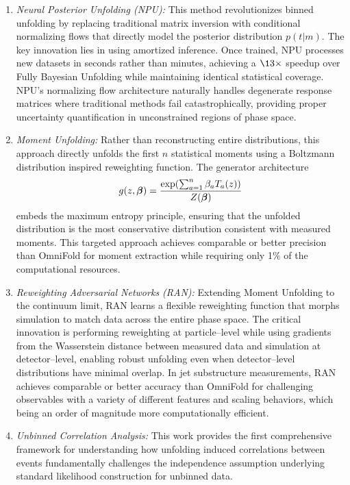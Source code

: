         \begin{enumerate}
            \item \emph{Neural Posterior Unfolding (NPU):} This method revolutionizes binned unfolding by replacing traditional matrix inversion with conditional normalizing flows that directly model the posterior distribution \(p(t|m)\).
            The key innovation lies in using amortized inference.
            Once trained, NPU processes new datasets in seconds rather than minutes, achieving a \(\13\times\) speedup over Fully Bayesian Unfolding while maintaining identical statistical coverage.
            NPU's normalizing flow architecture naturally handles degenerate response matrices where traditional methods fail catastrophically, providing proper uncertainty quantification in unconstrained regions of phase space.
            \item \emph{Moment Unfolding:} Rather than reconstructing entire distributions, this approach directly unfolds the first \(n\) statistical moments using a Boltzmann distribution inspired reweighting function.
            The generator architecture \[g(z,\vb*{\beta}) = \frac{\exp(\sum_{a=1}^n \beta_a T_a(z))}{Z(\vb*{\beta})}\] embeds the maximum entropy principle, ensuring that the unfolded distribution is the most conservative distribution consistent with measured moments.
            This targeted approach achieves comparable or better precision than OmniFold for moment extraction while requiring only 1\(\%\) of the computational resources.
            \item \emph{Reweighting Adversarial Networks (RAN):} Extending Moment Unfolding to the continuum limit, RAN learns a flexible reweighting function that morphs simulation to match data across the entire phase space.
            The critical innovation is performing reweighting at particle--level while using gradients from the Wasserstein distance between measured data and simulation at detector--level, enabling robust unfolding even when detector--level distributions have minimal overlap.
            In jet substructure measurements, RAN achieves comparable or better accuracy than OmniFold for challenging observables with a variety of different features and scaling behaviors, which being an order of magnitude more computationally efficient.
            \item \emph{Unbinned Correlation Analysis:} This work provides the first comprehensive framework for understanding how unfolding induced correlations between events fundamentally challenges the independence assumption underlying standard likelihood construction for unbinned data.

\end{enumerate}
